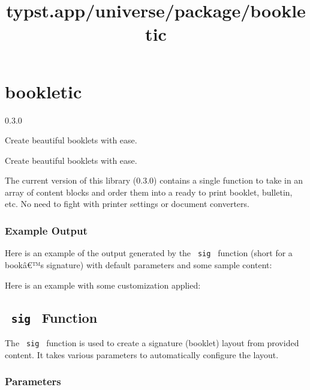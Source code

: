 \title{typst.app/universe/package/bookletic}

\label{banner}
\section{bookletic}\label{bookletic}

{ 0.3.0 }

Create beautiful booklets with ease.

\label{readme}
Create beautiful booklets with ease.

The current version of this library (0.3.0) contains a single function
to take in an array of content blocks and order them into a ready to
print booklet, bulletin, etc. No need to fight with printer settings or
document converters.

\subsubsection{Example Output}\label{example-output}

Here is an example of the output generated by the \texttt{\ sig\ }
function (short for a bookâ€™s signature) with default parameters and
some sample content:


Here is an example with some customization applied:


\subsection{\texorpdfstring{\texttt{\ sig\ }
Function}{ sig  Function}}\label{sig-function}

The \texttt{\ sig\ } function is used to create a signature (booklet)
layout from provided content. It takes various parameters to
automatically configure the layout.

\subsubsection{Parameters}\label{parameters}

